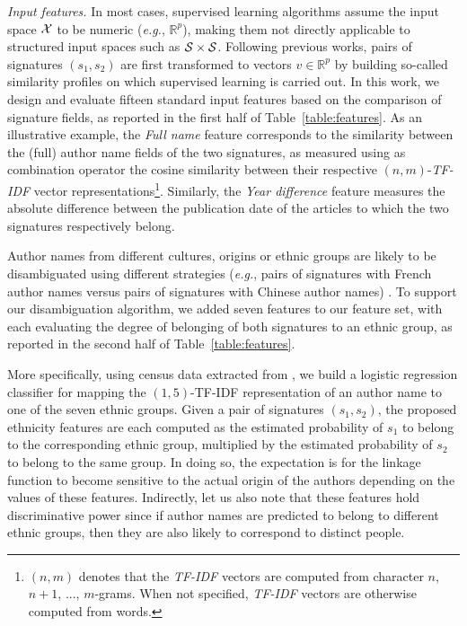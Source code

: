 \documentclass{article}
\newcommand{\eg}{\emph{e.g.}\xspace}
\begin{document}
\textit{Input features.} In most cases, supervised learning algorithms assume
the input space ${\cal X}$ to be numeric (\eg, $\mathbb{R}^p$), making them
not directly applicable to structured input spaces such as ${\cal S} \times
{\cal S}$.
Following previous works, pairs of signatures $(s_1, s_2)$ are first transformed to vectors $v \in \mathbb{R}^p$
by building so-called similarity profiles \citep{treeratpituk2009disambiguating} on which supervised learning is carried out.
In this work, we design and evaluate fifteen standard input
features based on the comparison of signature fields, as reported in the first
half of Table~\ref{table:features}.
As an illustrative example, the \textit{Full name} feature corresponds to the similarity between the (full)
author name fields of the two signatures, as measured using as combination
operator the cosine similarity between their respective $(n,m)$-\emph{TF-IDF} vector
representations\footnote{$(n,m)$ denotes that the \emph{TF-IDF} vectors are computed
from character $n$, $n+1$, ..., $m$-grams.
When not specified, \emph{TF-IDF} vectors are otherwise computed from words.}.
Similarly, the \textit{Year difference} feature measures the absolute difference between the publication date of the
articles to which the two signatures respectively belong.

Author names from different cultures, origins or ethnic groups are likely to be
disambiguated using different strategies (\eg, pairs of signatures with French
author names versus pairs of signatures with Chinese author names) \citep{treeratpituk2012name, chin2014effective}.
To support our disambiguation algorithm, we added seven features to our feature set, with each
evaluating the degree of belonging of both signatures to an ethnic group,
as reported in the second half of Table~\ref{table:features}.

More specifically, using census data extracted from \citep{rugglesintegrated}, we
build a logistic regression classifier for mapping the $(1,5)$-TF-IDF
representation of an author name to one of the seven ethnic groups.
Given a pair of signatures $(s_1, s_2)$, the proposed ethnicity
features are each computed as the estimated probability of $s_1$ to belong to
the corresponding ethnic group, multiplied by the estimated probability of
$s_2$ to belong to the same group. In doing so, the expectation is for the
linkage function to become sensitive to the actual origin of the authors
depending on the values of these features.
Indirectly, let us also note that these features hold discriminative power since
if author names are predicted to belong to different ethnic groups, then they
are also likely to correspond to distinct people.
\end{document}
